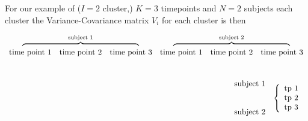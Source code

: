 \documentclass{article}
\begin{document}
For our example of ($I=2$ cluster,) $K=3$ timepoints and $N=2$ subjects each cluster the Variance-Covariance matrix $V_i$ for each cluster is then

\begin{tiny}
\begin{eqnarray*}
 \begin{array}{cccccc}
  \multicolumn{3}{c}{\overbrace{\rule{5.2cm}{0pt}}^{\textrm{subject 1}}} & \multicolumn{3}{c}{\overbrace{\rule{5.2cm}{0pt}}^{\textrm{subject 2}}}\\[-2pt]
  \textrm{time point 1}	&\textrm{time point 2}	&\textrm{time point 3}&\textrm{time point 1}	&\textrm{time point 2}	&\textrm{time point 3}\cr
  \end{array}\cr
  \begin{array}{c}  
  	\cr
	\cr
 	\textrm{subject 1} \cr
	\cr
	\cr
 	\textrm{subject 2} \cr
	\cr
 \end{array}
 \begin{array}{c}  
  	\cr
	\left\{
	\begin{array}{c}  
		\textrm{tp 1} 	\cr
 		\textrm{tp 2} \cr
		\textrm{tp 3}	\cr
 	\end{array}\right.	\cr

\end{array}
\end{eqnarray*}
\end{tiny}
\end{document}
